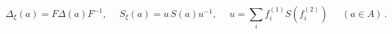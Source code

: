 \begin{equation}\label{boro2.1}
\Delta_\xi (a)=F\Delta(a)F^{-1},\quad\;S_\xi(a)=u\,S(a)u^{-1},
\quad\;u= \sum_i f^{(1)}_{i}S(f^{(2)}_i)\,\quad\;
(a\in A)\,.\end{equation}

